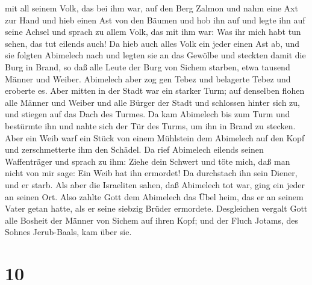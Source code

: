 mit all seinem Volk, das bei ihm war, auf den Berg Zalmon und nahm eine
Axt zur Hand und hieb einen Ast von den Bäumen und hob ihn auf und legte
ihn auf seine Achsel und sprach zu allem Volk, das mit ihm war: Was ihr
mich habt tun sehen, das tut eilends auch!  Da hieb auch
alles Volk ein jeder einen Ast ab, und sie folgten Abimelech nach und
legten sie an das Gewölbe und steckten damit die Burg in Brand, so daß
alle Leute der Burg von Sichem starben, etwa tausend Männer und Weiber.
 Abimelech aber zog gen Tebez und belagerte Tebez und
eroberte es.  Aber mitten in der Stadt war ein starker
Turm; auf denselben flohen alle Männer und Weiber und alle Bürger der
Stadt und schlossen hinter sich zu, und stiegen auf das Dach des Turmes.
 Da kam Abimelech bis zum Turm und bestürmte ihn und
nahte sich der Tür des Turms, um ihn in Brand zu stecken.
 Aber ein Weib warf ein Stück von einem Mühlstein dem
Abimelech auf den Kopf und zerschmetterte ihm den Schädel.
 Da rief Abimelech eilends seinen Waffenträger und sprach
zu ihm: Ziehe dein Schwert und töte mich, daß man nicht von mir sage:
Ein Weib hat ihn ermordet! Da durchstach ihn sein Diener, und er starb.
 Als aber die Israeliten sahen, daß Abimelech tot war,
ging ein jeder an seinen Ort.  Also zahlte Gott dem
Abimelech das Übel heim, das er an seinem Vater getan hatte, als er
seine siebzig Brüder ermordete.  Desgleichen vergalt Gott
alle Bosheit der Männer von Sichem auf ihren Kopf; und der Fluch Jotams,
des Sohnes Jerub-Baals, kam über sie.

\hypertarget{section-9}{%
\section{10}\label{section-9}}


